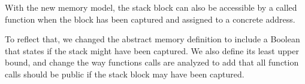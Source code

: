 With the new memory model, the stack block can also be accessible by a called function when the block has been captured and assigned to a concrete address.

To reflect that, we changed the abstract memory definition to include a Boolean that states if the stack might have been captured. We also define its least upper bound, and change the way functions calls are analyzed to add that all function calls should be public if the stack block may have been captured.
